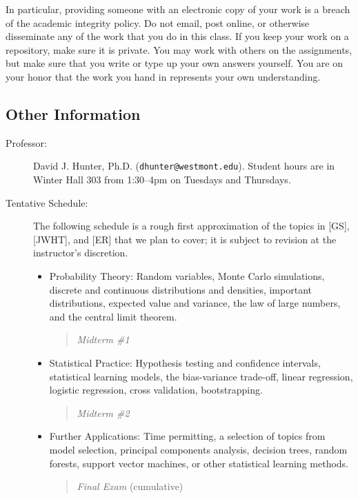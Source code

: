 \documentclass[
  twoside]{article}
\begin{document}
In particular, providing someone with an electronic copy of your work is
a breach of the academic integrity policy. Do not email, post online, or
otherwise disseminate any of the work that you do in this class. If you
keep your work on a repository, make sure it is private. You may work
with others on the assignments, but make sure that you write or type up
your own answers yourself. You are on your honor that the work you hand
in represents your own understanding.

\clearpage

\hypertarget{other-information}{%
\subsection{Other Information}\label{other-information}}

\begin{description} 

\item[Professor:] David J. Hunter, Ph.D.
  (\verb!dhunter@westmont.edu!). Student hours are in Winter Hall 303 
  from 1:30--4pm on Tuesdays and Thursdays.

 \item[Tentative Schedule:] The following schedule is a rough first approximation of the topics in [GS], [JWHT], and [ER] that we plan to cover; it is subject to revision at the instructor's discretion. 
  \begin{itemize}
      \item Probability Theory: Random variables, Monte Carlo simulations, discrete and continuous distributions and densities, important distributions, expected value and variance, the law of large numbers, and the central limit theorem.
   \begin{quote}
    \textit{Midterm \#1}     
   \end{quote}
      \item Statistical Practice: Hypothesis testing and confidence intervals, statistical learning models, the bias-variance trade-off, linear regression, logistic regression, cross validation, bootstrapping. 
   \begin{quote}
    \textit{Midterm \#2}  
   \end{quote}
      \item Further Applications: Time permitting, a selection of topics from model selection, principal components analysis, decision trees, random forests, support vector machines, or other statistical learning methods.
   \begin{quote}
    \textit{Final Exam}     (cumulative)
   \end{quote}
  \end{itemize}


\end{description}
\end{document}
